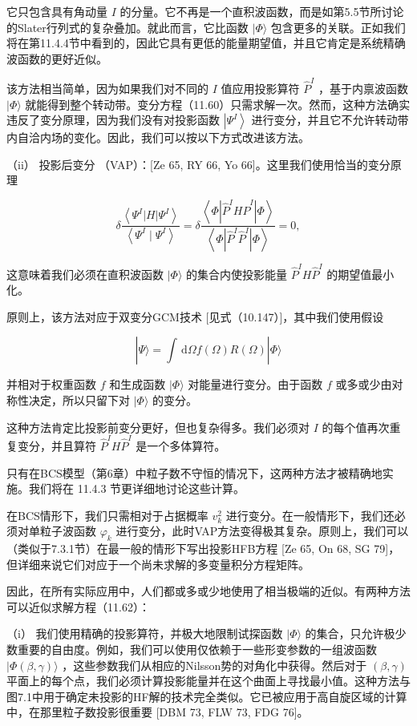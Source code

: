 它只包含具有角动量 $I$ 的分量。它不再是一个直积波函数，而是如第5.5节所讨论的Slater行列式的复杂叠加。就此而言，它比函数
$|\Phi\rangle$ 包含更多的关联。正如我们将在第11.4.4节中看到的，因此它具有更低的能量期望值，并且它肯定是系统精确波函数的更好近似。

该方法相当简单，因为如果我们对不同的 $I$ 值应用投影算符 ${\widehat{P}}^{I}$ ，基于内禀波函数 $|\Phi\rangle$
就能得到整个转动带。变分方程（11.60）只需求解一次。然而，这种方法确实违反了变分原理，因为我们没有对投影函数 $\left|{\Psi}^{I}\right\rangle $
进行变分，并且它不允许转动带内自洽内场的变化。因此，我们可以按以下方式改进该方法。

（ii） 投影后变分 （VAP）：{[}Ze 65, RY 66, Yo 66{]}。这里我们使用恰当的变分原理

\[
\delta\frac{\left\langle {\Psi}^{I}\left|H\right|{\Psi}^{I}\right\rangle }{\left\langle {\Psi}^{I}\mid{\Psi}^{I}\right\rangle }=\delta\frac{\left\langle \Phi\left|{\widehat{P}}^{I}H{\widehat{P}}^{I}\right|\Phi\right\rangle }{\left\langle \Phi\left|{\widehat{P}}^{I}{\widehat{P}}^{I}\right|\Phi\right\rangle }=0,\tag{11.62}
\]

这意味着我们必须在直积波函数 $|\Phi\rangle$ 的集合内使投影能量 ${\widehat{P}}^{I}H{\widehat{P}}^{I}$
的期望值最小化。

原则上，该方法对应于双变分GCM技术 {[}见式（10.147）{]}，其中我们使用假设

\[
|\Psi\rangle=\int{\,\mathrm{d}\Omega f(\Omega)R(\Omega)}|\Phi\rangle\tag{11.63}
\]

并相对于权重函数 $f$ 和生成函数 $|\Phi\rangle$ 对能量进行变分。由于函数 $f$ 或多或少由对称性决定，所以只留下对
$|\Phi\rangle$ 的变分。

这种方法肯定比投影前变分更好，但也复杂得多。我们必须对 $I$ 的每个值再次重复变分，并且算符 ${\widehat{P}}^{I}H{\widehat{P}}^{I}$
是一个多体算符。

只有在BCS模型（第6章）中粒子数不守恒的情况下，这两种方法才被精确地实施。我们将在 11.4.3 节更详细地讨论这些计算。

在BCS情形下，我们只需相对于占据概率 ${v}^{2}_{k}$ 进行变分。在一般情形下，我们还必须对单粒子波函数 ${\varphi}_{k}$
进行变分，此时VAP方法变得极其复杂。原则上，我们可以（类似于7.3.1节）在最一般的情形下写出投影HFB方程 {[}Ze 65,
On 68, SG 79{]}，但详细来说它们对应于一个尚未求解的多变量积分方程矩阵。

因此，在所有实际应用中，人们都或多或少地使用了相当极端的近似。有两种方法可以近似求解方程（11.62）：

（i） 我们使用精确的投影算符，并极大地限制试探函数 $|\Phi\rangle$ 的集合，只允许极少数重要的自由度。例如，我们可以使用仅依赖于一些形变参数的一组波函数
$|\Phi\left({\beta,\gamma}\right)\rangle$ ，这些参数我们从相应的Nilsson势的对角化中获得。然后对于
$\left({\beta,\gamma}\right)$ 平面上的每个点，我们必须计算投影能量并在这个曲面上寻找最小值。这种方法与图7.1中用于确定未投影的HF解的技术完全类似。它已被应用于高自旋区域的计算中，在那里粒子数投影很重要
{[}DBM 73, FLW 73, FDG 76{]}。


